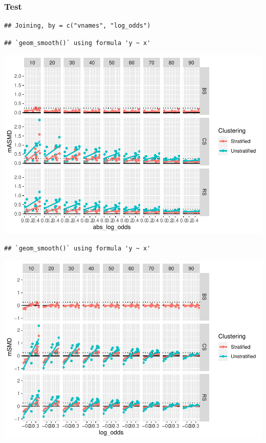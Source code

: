 \documentclass[
  english,
  man,floatsintext]{apa6}
\begin{document}
\hypertarget{test}{%
\subsubsection{Test}\label{test}}

\begin{verbatim}
## Joining, by = c("vnames", "log_odds")
\end{verbatim}

\begin{verbatim}
## `geom_smooth()` using formula 'y ~ x'
\end{verbatim}

\includegraphics{5---Analysis_files/figure-latex/unnamed-chunk-20-1.pdf}

\begin{verbatim}
## `geom_smooth()` using formula 'y ~ x'
\end{verbatim}

\includegraphics{5---Analysis_files/figure-latex/unnamed-chunk-20-2.pdf}
\end{document}
